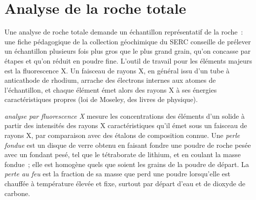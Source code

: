 \begin{omfigure}
\begin{minipage}[b]{0.49\linewidth}
\end{minipage}
\par{}
\end{omfigure}

\section{Analyse de la roche totale}\label{sec:b2:field-lab-methods-2:whole-rock}

Une analyse de roche totale demande un échantillon représentatif de la roche~: une fiche pédagogique de la collection géochimique du SERC conseille de prélever
un échantillon plusieurs fois plus gros que le plus grand grain, qu'on concasse par étapes et qu'on réduit en poudre fine. L'outil de travail pour les
éléments majeurs est la fluorescence X. Un faisceau de rayons X, en général issu d'un tube à anticathode de rhodium, arrache
des électrons internes aux atomes de l'échantillon, et chaque élément émet alors des rayons X
à ses énergies caractéristiques propres
(loi de Moseley, des livres de physique).

\begin{definition}\label{def:b2:field-lab-methods-2:xrf}
\emph{analyse par fluorescence X} mesure les concentrations
des éléments d'un solide à partir des intensités des rayons X caractéristiques qu'il émet sous un
faisceau de rayons X, par comparaison avec des étalons de composition connue. Une \emph{perle
fondue} est un disque de verre obtenu en faisant fondre une poudre de roche pesée avec un fondant pesé,
tel que le tétraborate de lithium, et en coulant la masse fondue~; elle est homogène quels que soient les grains de la
poudre de départ. La \emph{perte au feu} est la fraction de sa masse que perd une poudre
lorsqu'elle est chauffée à température élevée et fixe, surtout par départ d'eau et de dioxyde de carbone.
\end{definition}

